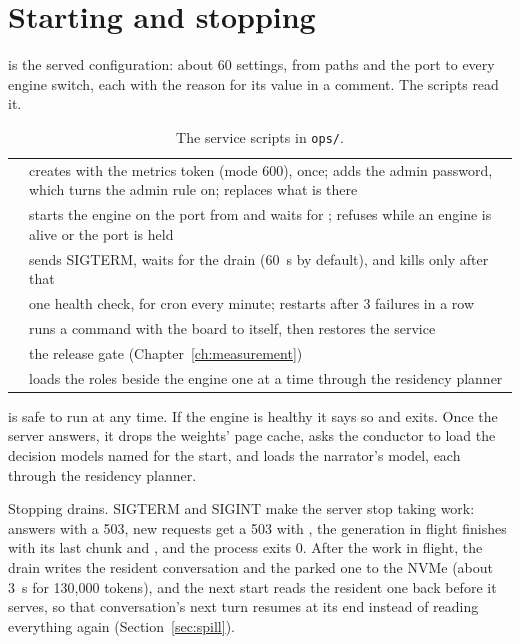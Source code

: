 \section{Starting and stopping}

 is the served configuration: about 60 settings, from paths and the port to every engine switch, each with the reason for its value in a comment. The scripts read it.

\begin{table}[htbp]
\centering\small
\caption{The service scripts in \texttt{ops/}.}\label{tab:ops-scripts}
\begin{tabularx}{\linewidth}{@{}L{.3\linewidth}Y@{}}
\toprule
{} &  \\
\midrule
{} & creates  with the metrics token (mode 600), once;  adds the admin password, which turns the admin rule on;  replaces what is there \\
 & starts the engine on the port from  and waits for ; refuses while an engine is alive or the port is held \\
 & sends SIGTERM, waits for the drain (60~s by default), and kills only after that \\
 & one health check, for cron every minute; restarts after 3 failures in a row \\
 & runs a command with the board to itself, then restores the service \\
 & the release gate (Chapter~\ref{ch:measurement}) \\
 & loads the roles beside the engine one at a time through the residency planner \\
\bottomrule
\end{tabularx}
\end{table}

 is safe to run at any time. If the engine is healthy it says so and exits. Once the server answers, it drops the weights' page cache, asks the conductor to load the decision models named for the start, and loads the narrator's model, each through the residency planner.

Stopping drains. SIGTERM and SIGINT make the server stop taking work:  answers  with a 503, new requests get a 503 with , the generation in flight finishes with its last chunk and \code{[DONE]}, and the process exits 0. After the work in flight, the drain writes the resident conversation and the parked one to the NVMe (about 3~s for 130,000 tokens), and the next start reads the resident one back before it serves, so that conversation's next turn resumes at its end instead of reading everything again (Section~\ref{sec:spill}).

